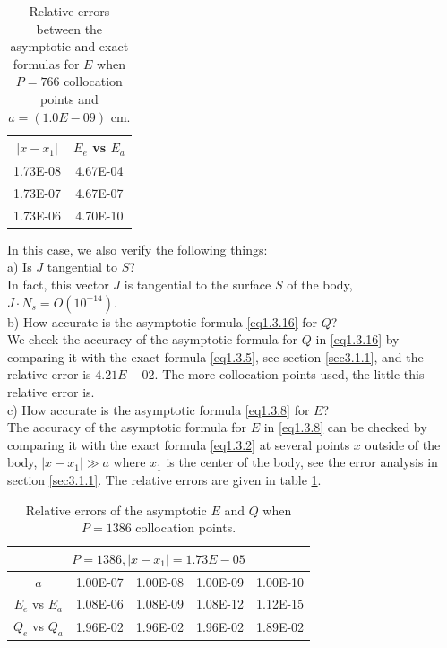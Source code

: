 \documentclass[12pt]{article}
\numberwithin{equation}{section}
\begin{document}
\begin{table}[htbp]
  \centering
  \caption{Relative errors between the asymptotic and exact formulas for $E$ when $P=766$ collocation points and $a=(1.0E-09)$ cm.}
    \begin{tabular}{cc}
    \toprule
    $|x-x_1|$ & $E_{e}$ vs $E_{a}$ \\
    \midrule
	1.73E-08 & 4.67E-04 \\
    1.73E-07 & 4.67E-07 \\
    1.73E-06 & 4.70E-10 \\
    \bottomrule
    \end{tabular}%
  \label{tab3.1.2.3}%
\end{table}%

In this case, we also verify the following things:\\
a) Is $J$ tangential to $S$? \\
In fact, this vector $J$ is tangential to the surface $S$ of the body, $J\cdot N_s= O(10^{-14})$. \\
b) How accurate is the asymptotic formula \eqref{eq1.3.16} for $Q$?\\
We check the accuracy of the asymptotic formula for $Q$ in \eqref{eq1.3.16} by comparing it with the exact formula \eqref{eq1.3.5}, see section \ref{sec3.1.1}, and the relative error is $4.21E-02$. The more collocation points used, the little this relative error is. \\
c) How accurate is the asymptotic formula \eqref{eq1.3.8} for $E$?\\
The accuracy of the asymptotic formula for $E$ in \eqref{eq1.3.8} can be checked by comparing it with the exact formula \eqref{eq1.3.2} at several points $x$ outside of the body, $|x-x_1|\gg a$ where $x_1$ is the center of the body, see the error analysis in section \ref{sec3.1.1}. The relative errors are given in table \ref{tab3.1.2.3}.

\begin{table}[htbp]
  \centering
  \caption{Relative errors of the asymptotic $E$ and $Q$ when $P=1386$ collocation points.}
    \begin{tabular}{ccccc}
    \toprule
    \multicolumn{5}{c}{$P=1386, |x-x_1|=1.73E-05$} \\
    \midrule
	$a$     			& 1.00E-07 & 1.00E-08 & 1.00E-09 & 1.00E-10 \\
    $E_{e}$ vs $E_{a}$ & 1.08E-06 & 1.08E-09 & 1.08E-12 & 1.12E-15 \\
    $Q_{e}$ vs $Q_{a}$ & 1.96E-02 & 1.96E-02 & 1.96E-02 & 1.89E-02 \\
    \bottomrule
    \end{tabular}%
  \label{tab3.1.2.4}%
\end{table}%
\end{document}
